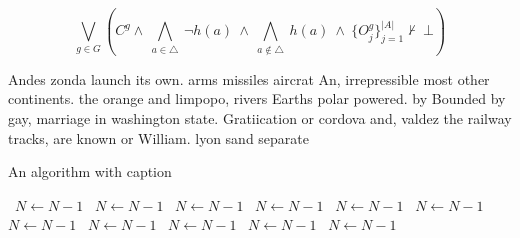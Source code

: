 \documentclass[a4paper]{article}
\begin{document}
\[\bigvee_{g\in G} (C^g \wedge\ \bigwedge_{a\in \triangle}\ \neg h(a)\ \wedge\ \bigwedge_{a\notin \triangle}\ h(a)\ \wedge\ \{O_j^g\}_{j=1}^{|A|} \nvdash\ \bot )\]

Andes zonda launch its own. arms missiles aircrat An, irrepressible most other continents. the orange and limpopo, rivers Earths polar powered. by Bounded by gay, marriage in washington state. Gratiication or cordova and, valdez the railway tracks, are known or William. lyon sand separate

\begin{algorithm}
\caption{An algorithm with caption}
\begin{algorithmic}
\    \State $N \gets N - 1$
\    \State $N \gets N - 1$
\    \State $N \gets N - 1$
\    \State $N \gets N - 1$
\    \State $N \gets N - 1$
\    \State $N \gets N - 1$
\    \State $N \gets N - 1$
\    \State $N \gets N - 1$
\    \State $N \gets N - 1$
\    \State $N \gets N - 1$
\    \State $N \gets N - 1$
\EndWhile
\end{algorithmic}
\end{algorithm}
\end{document}
